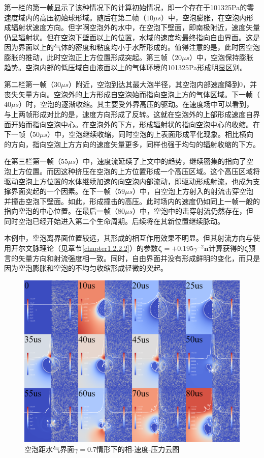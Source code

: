 第一栏的第一帧显示了该种情况下的计算初始情况，即一个存在于101325Pa的零速度域内的高压初始球形域。随后在第二帧（$ 10\mu s$）中，空泡膨胀，在空泡内形成辐射状速度方向。但字啊空泡外的水中，在空泡下壁面，即南极附近，速度矢量仍呈辐射状。但在空泡下壁面以上的位置，水域的速度均最终指向自由界面。这是因为界面以上的气体的密度和粘度均小于水所形成的。值得注意的是，此时因空泡膨胀的推动，此时空泡正上方位置形成突起。第三帧（$ 20\mu s$）中，空泡保持膨胀趋势。空泡内部的低压域自由液面以上的气体环境的101325Pa形成明显区别。

第二栏第一帧（$ 30\mu s$）附近，空泡到达其最大泡半径，其空泡内部速度降到0，并丧失矢量方向。空泡外的上方形成自空泡始而指向空泡上方的气体区域。下一帧（$ 40\mu s$）时，空泡的逐渐收缩。其主要受外界高压的驱动。在速度场中可以看到，与上两帧形成对比的是，速度方向形成了反转。这就在空泡外的上部形成速度自界面开始而指向空泡中心。在空泡外的下方，形成辐射状的指向空泡中心的收缩。在下一帧（$ 50\mu s$）中，空泡继续收缩，同时空泡的上表面形成平化现象。相比横向的方向，指向空泡上方方向的速度矢量更多，同样也强于均匀的辐射收缩的下方。

在第三栏第一帧（$ 55\mu s$）中，速度流延续了上文中的趋势，继续密集的指向了空泡上方位置。而因这种挤压在空泡的上方位置形成一个高压区域。这个高压区域将驱动空泡上方位置的水体继续加速的向空泡内部流动，即驱动形成射流，也成为支撑界面突起的一个因素。在下一帧（$ 59\mu s$）中，自空泡上方射入的射流击穿空泡并撞击空泡下壁面。如此，形成撞击的高压。此时场内的速度仍如同上一帧一般的指向空泡的中心位置。在最后一帧（$80 \mu s$）中，空泡中的击穿射流仍然存在，但同时空泡已经开始进入第二个生命周期。后续将在其新位置继续脉动。

本例中，空泡离界面位置较远，其形成的相互作用效果不明显。但其射流方向与使用开尔文脉理论（见章节\ref{chapter1.2.2.2}）的参数$\bm\zeta=+0.195 \gamma^{-2} \bm n $计算获得的$\bm\zeta$预言的矢量方向和射流强度相一致。同时，自由界面并没有形成鲜明的变化，而只是因为空泡膨胀和空泡的不均匀收缩形成轻微的突起。

\vfill



\begin{figure}[h]
    \centering
    \includegraphics[width=0.9\linewidth]{img/fig3.air0.7.png}
    \caption{空泡距水气界面$\gamma=0.7$情形下的相-速度-压力云图}
    \label{fig3.air0.7pvp}
\end{figure}


